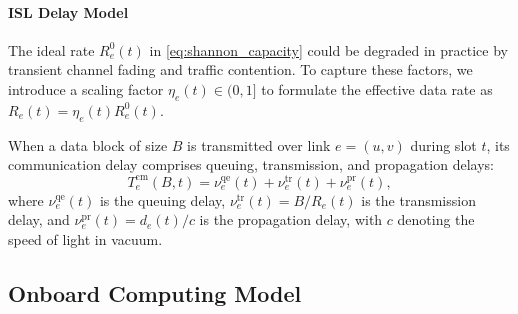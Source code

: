 \documentclass[10pt, conference, letterpaper]{IEEEtran}
\begin{document}
\paragraph{ISL Delay Model}
The ideal rate $R^0_e(t)$ in \eqref{eq:shannon_capacity} could be degraded in practice by transient channel fading and traffic contention.
To capture these factors, we introduce a scaling factor $\eta_e(t)\in(0,1]$ to formulate the effective data rate as $R_e(t)=\eta_e(t)R^0_e(t)$.

When a data block of size $B$ is transmitted over link $e=(u,v)$ during slot $t$, its communication delay comprises queuing, transmission, and propagation delays:
\begin{equation}
T_e^{\text{cm}}(B,t) = \nu_e^{\text{qe}}(t) + \nu_e^{\text{tr}}(t) + \nu_e^{\text{pr}}(t),
\label{eq:link_delay_elara}
\end{equation}
where $\nu_e^{\text{qe}}(t)$ is the queuing delay, $\nu_e^{\text{tr}}(t) = B / R_e(t)$ is the transmission delay, and $\nu_e^{\text{pr}}(t)=d_e(t)/c$ is the propagation delay, with $c$ denoting the speed of light in vacuum.




\subsection{Onboard Computing Model}
\label{subsec:compute_model_elara}
\end{document}
